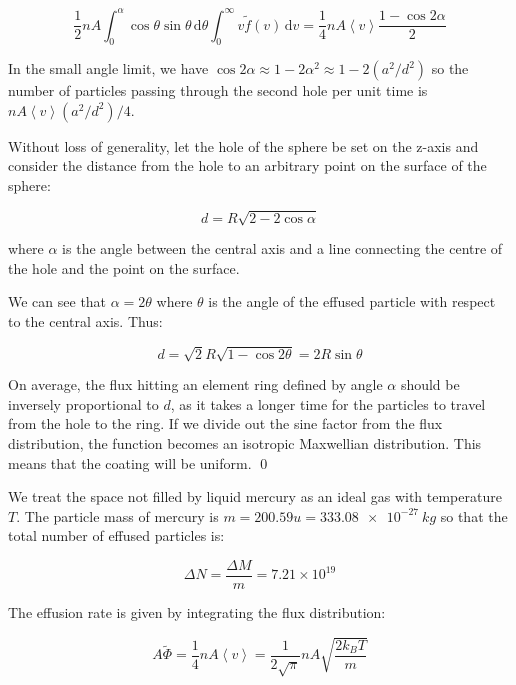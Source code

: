 \documentclass[12pt]{article}
\begin{document}
\begin{equation}
    \frac{1}{2} nA \int_{0}^{\alpha} \cos{\theta} \sin{\theta} \, \mathrm{d}\theta \int_{0}^{\infty} v \tilde{f}(v) \, \mathrm{d}v = \frac{1}{4} nA \left\langle v \right\rangle \frac{1 - \cos{2\alpha}}{2}
\end{equation}

In the small angle limit, we have $\cos{2\alpha} \approx 1 - 2\alpha^{2} \approx 1 - 2(a^{2}/d^{2})$ so the number of particles passing through the second hole per unit time is $nA \left\langle v \right\rangle (a^{2}/d^{2})/4$.

Without loss of generality, let the hole of the sphere be set on the z-axis and consider the distance from the hole to an arbitrary point on the surface of the sphere:

\begin{equation}
    d = R \sqrt{2 - 2\cos{\alpha}}
\end{equation}

where $\alpha$ is the angle between the central axis and a line connecting the centre of the hole and the point on the surface.

We can see that $\alpha = 2\theta$ where $\theta$ is the angle of the effused particle with respect to the central axis. Thus:

\begin{equation}
    d = \sqrt{2}R \sqrt{1 - \cos{2\theta}} = 2R \sin{\theta}
\end{equation}

On average, the flux hitting an element ring defined by angle $\alpha$ should be inversely proportional to $d$, as it takes a longer time for the particles to travel from the hole to the ring. If we divide out the sine factor from the flux distribution, the function becomes an isotropic Maxwellian distribution. This means that the coating will be uniform.
\qed


We treat the space not filled by liquid mercury as an ideal gas with temperature $T$. The particle mass of mercury is $m = 200.59u = \qty{333.08e-27}{kg}$ so that the total number of effused particles is:

\begin{equation}
    \Delta N = \frac{\Delta M}{m} = 7.21 \times 10^{19}
\end{equation}

The effusion rate is given by integrating the flux distribution:

\begin{equation}
    A\tilde{\Phi} = \frac{1}{4} nA \left\langle v \right\rangle = \frac{1}{2\sqrt{\pi}} nA \sqrt{\frac{2k_{B}T}{m}}
\end{equation}
\end{document}
